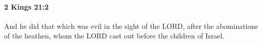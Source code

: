 
		\paragraph{2 Kings 21:2} %
			\label{2KINGS-21-2}

			And he did that which was evil in the sight of the LORD, after the abominations of the heathen, whom the LORD cast out before the children of Israel.


